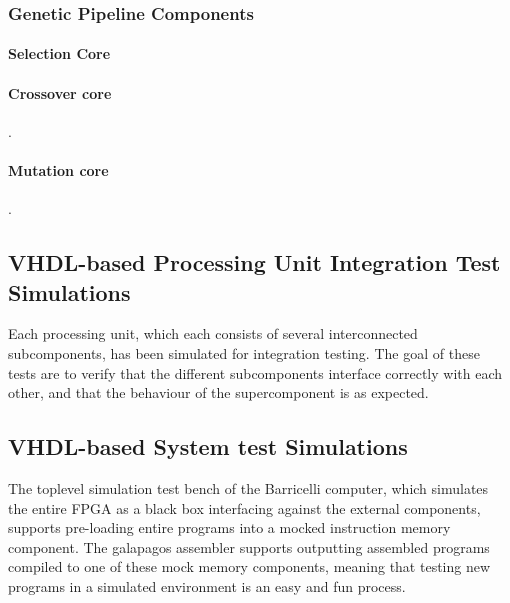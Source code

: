 \subsubsection{Genetic Pipeline Components}
\paragraph{Selection Core}



\newpage
\paragraph{Crossover core}
.





\newpage
\paragraph{Mutation core}
.




\subsection{\gls{VHDL}-based Processing Unit Integration Test Simulations}

Each processing unit, which each consists of several interconnected subcomponents, has been simulated for integration testing.
The goal of these tests are to verify that the different subcomponents interface correctly with each other, and that the behaviour of the supercomponent is as expected.


\subsection{\gls{VHDL}-based System test Simulations}
\label{section:testing:fpga:system-tests}

The toplevel simulation test bench of the Barricelli computer, which simulates the entire FPGA as a black box interfacing against the external components, supports pre-loading entire programs into a mocked instruction memory component.
The \Gls{galapagos assembler} supports outputting assembled programs compiled to one of these mock memory components, meaning that testing new programs in a simulated environment is an easy and fun process.

